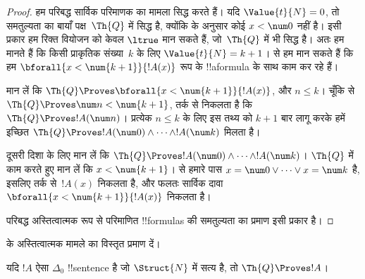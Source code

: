 \documentclass[../../../include/open-logic-section]{subfiles}
\begin{document}
\begin{proof}
    हम परिबद्ध सार्विक परिमाणक का मामला सिद्ध करते हैं। यदि
    $\Value{t}{N} = 0$, तो समतुल्यता का बायाँ पक्ष~$\Th{Q}$ में सिद्ध है,
    क्योंकि  के अनुसार कोई
    $x<\num 0$ नहीं है। इसी प्रकार हम रिक्त वियोजन को केवल $\ltrue$ मान
    सकते हैं, जो~$\Th{Q}$ में भी सिद्ध है।
    अतः हम मानते हैं कि किसी प्राकृतिक संख्या~$k$ के लिए
    $\Value{t}{N} = k+1$।  से हम मान सकते
    हैं कि हम $\bforall{x<\num{k+1}}{!A(x)}$ रूप के !!a{formula} के साथ
    काम कर रहे हैं।

    मान लें कि $\Th{Q} \Proves \bforall{x<\num{k+1}}{!A(x)}$, और
    $n \leq k$। चूँकि  से
    $\Th{Q} \Proves \num n < \num{k+1}$, तर्क से निकलता है कि
    $\Th{Q} \Proves !A(\num n)$। प्रत्येक $n \leq k$ के लिए इस तथ्य को
    $k+1$ बार लागू करके हमें इच्छित
    $\Th{Q} \Proves !A(\num 0) \land \dots \land !A(\num k)$ मिलता है।

    दूसरी दिशा के लिए मान लें कि
    $\Th{Q} \Proves !A(\num 0) \land \dots \land !A(\num k)$।
    $\Th{Q}$ में काम करते हुए मान लें कि $x < \num{k+1}$।
     से हमारे पास
    $x = \num 0 \lor \dots \lor x = \num k$ है, इसलिए तर्क से~$!A(x)$
    निकलता है, और फलतः सार्विक दावा
    $\bforall{x<\num{k+1}}{!A(x)}$ निकलता है।

    परिबद्ध अस्तित्वात्मक रूप से परिमाणित !!{formula}s की समतुल्यता का
    प्रमाण इसी प्रकार है।
\end{proof}

\begin{prob}
 के अस्तित्वात्मक मामले का विस्तृत प्रमाण
दें।
\end{prob}

\begin{lem}
यदि $!A$ ऐसा $\Delta_0$ !!{sentence} है जो $\Struct{N}$ में सत्य है, तो
$\Th{Q} \Proves !A$।
\end{lem}
\end{document}
